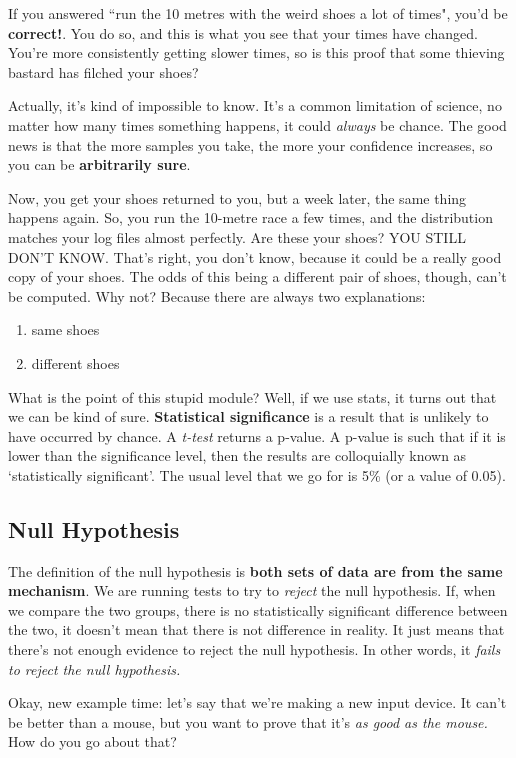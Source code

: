 \documentclass[11pt,a4paper,titlepage]{scrartcl}
\begin{document}
If you answered ``run the 10 metres with the weird shoes a lot of times",
you'd be \textbf{correct!}. You do so, and this is what you see that your
times have changed. You're more consistently getting slower times, so is
this proof that some thieving bastard has filched your shoes?

Actually, it's kind of impossible to know. It's a common limitation of
science, no matter how many times something happens, it could
\textit{always} be chance. The good news is that the more samples you
take, the more your confidence increases, so you can be
\textbf{arbitrarily sure}.

Now, you get your shoes returned to you, but a week later, the same thing
happens again. So, you run the 10-metre race a few times, and the
distribution matches your log files almost perfectly. Are these your
shoes? YOU STILL DON'T KNOW. That's right, you don't know, because it
could be a really good copy of your shoes. The odds of this being a
different pair of shoes, though, can't be computed. Why not? Because there
are always two explanations:
\begin{enumerate}
    \item same shoes
    \item different shoes
\end{enumerate}

What is the point of this stupid module? Well, if we use stats, it turns
out that we can be kind of sure. \textbf{Statistical significance} is a
result that is unlikely to have occurred by chance. A \textit{t-test}
returns a p-value. A p-value is such that if it is lower than the
significance level, then the results are colloquially known as
`statistically significant'. The usual level that we go for is 5\% (or a
value of 0.05).

\subsection{Null Hypothesis}%
\label{sub:Null Hypothesis}
The definition of the null hypothesis is \textbf{both sets of data are
from the same mechanism}. We are running tests to try to \textit{reject}
the null hypothesis. If, when we compare the two groups, there is no
statistically significant difference between the two, it doesn't mean that
there is not difference in reality. It just means that there's not enough
evidence to reject the null hypothesis. In other words, it \textit{fails
to reject the null hypothesis.}

Okay, new example time: let's say that we're making a new input device. It
can't be better than a mouse, but you want to prove that it's \textit{as
good as the mouse.} How do you go about that?
\end{document}

